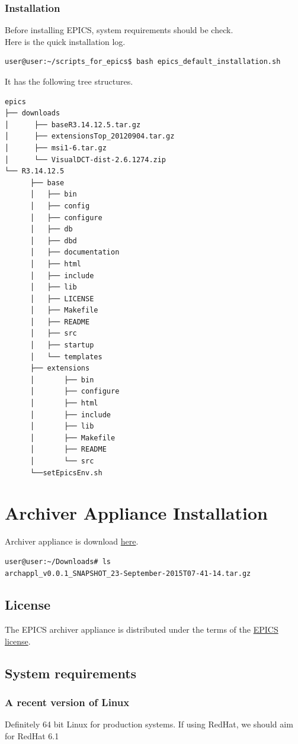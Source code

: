 \documentclass[11pt
  , a4paper
  , article
  , oneside
]{memoir}
\begin{document}
\subsection{Installation}
Before installing EPICS, system requirements should be check.\\
Here is the quick installation log.
\begin{lstlisting}[style=termstyle]
user@user:~/scripts_for_epics$ bash epics_default_installation.sh 
\end{lstlisting}
It has the following tree structures.
\begin{verbatim}
epics
├── downloads
│      ├── baseR3.14.12.5.tar.gz
│      ├── extensionsTop_20120904.tar.gz
│      ├── msi1-6.tar.gz
│      └── VisualDCT-dist-2.6.1274.zip
└── R3.14.12.5
      ├── base
      │   ├── bin
      │   ├── config
      │   ├── configure
      │   ├── db
      │   ├── dbd
      │   ├── documentation
      │   ├── html
      │   ├── include
      │   ├── lib
      │   ├── LICENSE
      │   ├── Makefile
      │   ├── README
      │   ├── src
      │   ├── startup
      │   └── templates
      ├── extensions
      │       ├── bin
      │       ├── configure
      │       ├── html
      │       ├── include
      │       ├── lib
      │       ├── Makefile
      │       ├── README
      │       └── src
      └──setEpicsEnv.sh
\end{verbatim}
\clearpage

\chapter{Archiver Appliance Installation}

Archiver appliance\cite{archappl} is download \href{http://sourceforge.net/projects/epicsarchiverap/files/snapshots/}{here}.
\begin{lstlisting}[style=termstyle]
user@user:~/Downloads# ls
archappl_v0.0.1_SNAPSHOT_23-September-2015T07-41-14.tar.gz
\end{lstlisting}
\section{License}
The EPICS archiver appliance is distributed under the terms of the \href{http://slacmshankar.github.io/epicsarchiver_docs/LICENSE}{EPICS license}.
\section{System requirements}
\subsection{A recent version of Linux}
Definitely 64 bit Linux for production systems. If using RedHat, we should aim for RedHat 6.1
\end{document}
